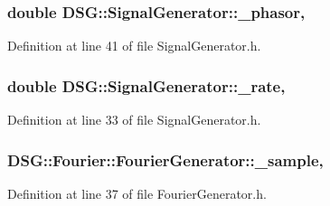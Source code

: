 \hypertarget{classDSG_1_1SignalGenerator_ac2271b582bf699275f077ecb642a8cd9}{
\subsubsection[{\-\_\-phasor}]{\setlength{\rightskip}{0pt plus 5cm}double D\-S\-G\-::\-Signal\-Generator\-::\-\_\-phasor\hspace{0.3cm}{\ttfamily [protected]}, {\ttfamily [inherited]}}}\label{classDSG_1_1SignalGenerator_ac2271b582bf699275f077ecb642a8cd9}


Definition at line 41 of file Signal\-Generator.\-h.

\hypertarget{classDSG_1_1SignalGenerator_aa10f6c85d9adee901139ea7fb346f39d}{
\subsubsection[{\-\_\-rate}]{\setlength{\rightskip}{0pt plus 5cm}double D\-S\-G\-::\-Signal\-Generator\-::\-\_\-rate\hspace{0.3cm}{\ttfamily [protected]}, {\ttfamily [inherited]}}}\label{classDSG_1_1SignalGenerator_aa10f6c85d9adee901139ea7fb346f39d}


Definition at line 33 of file Signal\-Generator.\-h.

\hypertarget{classDSG_1_1Fourier_1_1FourierGenerator_aaf63683d2173cd41ff1d65b4c454e87a}{
\subsubsection[{\-\_\-sample}]{ D\-S\-G\-::\-Fourier\-::\-Fourier\-Generator\-::\-\_\-sample\hspace{0.3cm}{\ttfamily [protected]}, {\ttfamily [inherited]}}}\label{classDSG_1_1Fourier_1_1FourierGenerator_aaf63683d2173cd41ff1d65b4c454e87a}


Definition at line 37 of file Fourier\-Generator.\-h.

